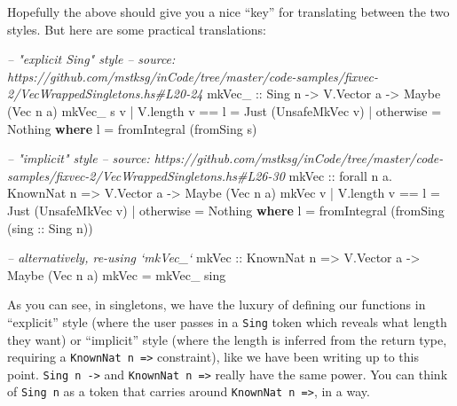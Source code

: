 \documentclass[]{article}
\newenvironment{Shaded}{}{}
\newcommand{\KeywordTok}[1]{\textcolor[rgb]{0.00,0.44,0.13}{\textbf{#1}}}
\newcommand{\DataTypeTok}[1]{\textcolor[rgb]{0.56,0.13,0.00}{#1}}
\newcommand{\CommentTok}[1]{\textcolor[rgb]{0.38,0.63,0.69}{\textit{#1}}}
\newcommand{\OtherTok}[1]{\textcolor[rgb]{0.00,0.44,0.13}{#1}}
\newcommand{\FunctionTok}[1]{\textcolor[rgb]{0.02,0.16,0.49}{#1}}
\newcommand{\NormalTok}[1]{#1}
\begin{document}
Hopefully the above should give you a nice ``key'' for translating between the
two styles. But here are some practical translations:

\begin{Shaded}
\begin{Highlighting}[]
\CommentTok{-- "explicit Sing" style}
\CommentTok{-- source: https://github.com/mstksg/inCode/tree/master/code-samples/fixvec-2/VecWrappedSingletons.hs#L20-24}
\OtherTok{mkVec_ ::} \DataTypeTok{Sing}\NormalTok{ n }\OtherTok{->} \DataTypeTok{V.Vector}\NormalTok{ a }\OtherTok{->} \DataTypeTok{Maybe}\NormalTok{ (}\DataTypeTok{Vec}\NormalTok{ n a)}
\NormalTok{mkVec_ s v }\FunctionTok{|}\NormalTok{ V.length v }\FunctionTok{==}\NormalTok{ l }\FunctionTok{=} \DataTypeTok{Just}\NormalTok{ (}\DataTypeTok{UnsafeMkVec}\NormalTok{ v)}
           \FunctionTok{|}\NormalTok{ otherwise       }\FunctionTok{=} \DataTypeTok{Nothing}
  \KeywordTok{where}
\NormalTok{    l }\FunctionTok{=}\NormalTok{ fromIntegral (fromSing s)}

\CommentTok{-- "implicit" style}
\CommentTok{-- source: https://github.com/mstksg/inCode/tree/master/code-samples/fixvec-2/VecWrappedSingletons.hs#L26-30}
\OtherTok{mkVec ::}\NormalTok{ forall n a}\FunctionTok{.} \DataTypeTok{KnownNat}\NormalTok{ n }\OtherTok{=>} \DataTypeTok{V.Vector}\NormalTok{ a }\OtherTok{->} \DataTypeTok{Maybe}\NormalTok{ (}\DataTypeTok{Vec}\NormalTok{ n a)}
\NormalTok{mkVec v }\FunctionTok{|}\NormalTok{ V.length v }\FunctionTok{==}\NormalTok{ l }\FunctionTok{=} \DataTypeTok{Just}\NormalTok{ (}\DataTypeTok{UnsafeMkVec}\NormalTok{ v)}
        \FunctionTok{|}\NormalTok{ otherwise       }\FunctionTok{=} \DataTypeTok{Nothing}
  \KeywordTok{where}
\NormalTok{    l }\FunctionTok{=}\NormalTok{ fromIntegral (fromSing (}\OtherTok{sing ::} \DataTypeTok{Sing}\NormalTok{ n))}

\CommentTok{-- alternatively, re-using `mkVec_`}
\OtherTok{mkVec ::} \DataTypeTok{KnownNat}\NormalTok{ n }\OtherTok{=>} \DataTypeTok{V.Vector}\NormalTok{ a }\OtherTok{->} \DataTypeTok{Maybe}\NormalTok{ (}\DataTypeTok{Vec}\NormalTok{ n a)}
\NormalTok{mkVec }\FunctionTok{=}\NormalTok{ mkVec_ sing}
\end{Highlighting}
\end{Shaded}

As you can see, in singletons, we have the luxury of defining our functions in
``explicit'' style (where the user passes in a \texttt{Sing} token which reveals
what length they want) or ``implicit'' style (where the length is inferred from
the return type, requiring a \texttt{KnownNat\ n\ =\textgreater{}} constraint),
like we have been writing up to this point. \texttt{Sing\ n\ -\textgreater{}}
and \texttt{KnownNat\ n\ =\textgreater{}} really have the same power. You can
think of \texttt{Sing\ n} as a token that carries around
\texttt{KnownNat\ n\ =\textgreater{}}, in a way.
\end{document}
